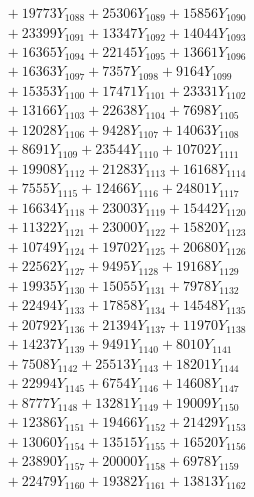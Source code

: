 \documentclass[a4paper,10pt]{article}
\begin{document}
{\begin{align}
&\;  + 19773 Y_{1088} + 25306 Y_{1089} + 15856 Y_{1090} \\[0.3ex]
&\;  + 23399 Y_{1091} + 13347 Y_{1092} + 14044 Y_{1093} \\[0.3ex]
&\;  + 16365 Y_{1094} + 22145 Y_{1095} + 13661 Y_{1096} \\[0.3ex]
&\;  + 16363 Y_{1097} + 7357 Y_{1098} + 9164 Y_{1099} \\[0.3ex]
&\;  + 15353 Y_{1100} + 17471 Y_{1101} + 23331 Y_{1102} \\[0.3ex]
&\;  + 13166 Y_{1103} + 22638 Y_{1104} + 7698 Y_{1105} \\[0.3ex]
&\;  + 12028 Y_{1106} + 9428 Y_{1107} + 14063 Y_{1108} \\[0.5ex]\allowbreak
&\;  + 8691 Y_{1109} + 23544 Y_{1110} + 10702 Y_{1111} \\[0.3ex]
&\;  + 19908 Y_{1112} + 21283 Y_{1113} + 16168 Y_{1114} \\[0.3ex]
&\;  + 7555 Y_{1115} + 12466 Y_{1116} + 24801 Y_{1117} \\[0.3ex]
&\;  + 16634 Y_{1118} + 23003 Y_{1119} + 15442 Y_{1120} \\[0.3ex]
&\;  + 11322 Y_{1121} + 23000 Y_{1122} + 15820 Y_{1123} \\[0.3ex]
&\;  + 10749 Y_{1124} + 19702 Y_{1125} + 20680 Y_{1126} \\[0.3ex]
&\;  + 22562 Y_{1127} + 9495 Y_{1128} + 19168 Y_{1129} \\[0.3ex]
&\;  + 19935 Y_{1130} + 15055 Y_{1131} + 7978 Y_{1132} \\[0.3ex]
&\;  + 22494 Y_{1133} + 17858 Y_{1134} + 14548 Y_{1135} \\[0.3ex]
&\;  + 20792 Y_{1136} + 21394 Y_{1137} + 11970 Y_{1138} \\[0.5ex]\allowbreak
&\;  + 14237 Y_{1139} + 9491 Y_{1140} + 8010 Y_{1141} \\[0.3ex]
&\;  + 7508 Y_{1142} + 25513 Y_{1143} + 18201 Y_{1144} \\[0.3ex]
&\;  + 22994 Y_{1145} + 6754 Y_{1146} + 14608 Y_{1147} \\[0.3ex]
&\;  + 8777 Y_{1148} + 13281 Y_{1149} + 19009 Y_{1150} \\[0.3ex]
&\;  + 12386 Y_{1151} + 19466 Y_{1152} + 21429 Y_{1153} \\[0.3ex]
&\;  + 13060 Y_{1154} + 13515 Y_{1155} + 16520 Y_{1156} \\[0.3ex]
&\;  + 23890 Y_{1157} + 20000 Y_{1158} + 6978 Y_{1159} \\[0.3ex]
&\;  + 22479 Y_{1160} + 19382 Y_{1161} + 13813 Y_{1162} \\[0.3ex]

\end{align}}
\end{document}
